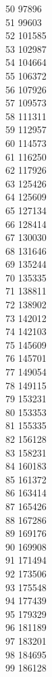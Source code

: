 { 50	97896 \\
 51	99603 \\
 52	101585 \\
 53	102987 \\
 54	104664 \\
 55	106372 \\
 56	107926 \\
 57	109573 \\
 58	111311 \\
 59	112957 \\
 60	114573 \\
 61	116250 \\
 62	117926 \\
 63	125426 \\
 64	125609 \\
 65	127134 \\
 66	128414 \\
 67	130030 \\
 68	131646 \\
 69	135244 \\
 70	135335 \\
 71	138811 \\
 72	138902 \\
 73	142012 \\
 74	142103 \\
 75	145609 \\
 76	145701 \\
 77	149054 \\
 78	149115 \\
 79	153231 \\
 80	153353 \\
 81	155335 \\
 82	156128 \\
 83	158231 \\
 84	160183 \\
 85	161372 \\
 86	163414 \\
 87	165426 \\
 88	167286 \\
 89	169176 \\
 90	169908 \\
 91	171494 \\
 92	173506 \\
 93	175548 \\
 94	177439 \\
 95	179329 \\
 96	181189 \\
 97	183201 \\
 98	184695 \\
 99	186128 \\
}
